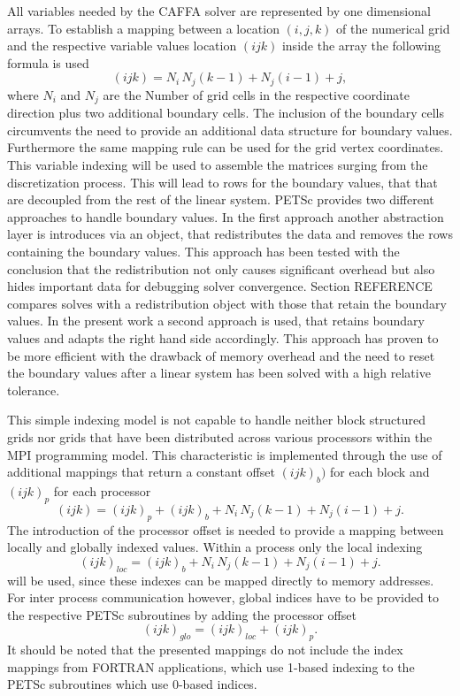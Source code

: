 All variables needed by the CAFFA solver are represented by one dimensional arrays. To establish a mapping between a location \((i,j,k)\) of the numerical grid and the respective variable values location \((ijk)\) inside the array the following formula is used
\begin{displaymath}
  (ijk) = N_i \, N_j \left(k - 1\right) + N_j \left(i - 1\right) + j,
\end{displaymath}
where \(N_i\) and \(N_j\) are the Number of grid cells in the respective coordinate direction plus two additional boundary cells. The inclusion of the boundary cells circumvents the need to provide an additional data structure for boundary values. Furthermore the same mapping rule can be used for the grid vertex coordinates. This variable indexing will be used to assemble the matrices surging from the discretization process. This will lead to rows for the boundary values, that that are decoupled from the rest of the linear system. PETSc provides two different approaches to handle boundary values. In the first approach another abstraction layer is introduces via an object, that redistributes the data and removes the rows containing the boundary values. This approach has been tested with the conclusion that the redistribution not only causes significant overhead but also hides important data for debugging solver convergence. Section REFERENCE compares solves with a redistribution object with those that retain the boundary values. In the present work a second approach is used, that retains boundary values and adapts the right hand side accordingly. This approach has proven to be more efficient with the drawback of memory overhead and the need to reset the boundary values after a linear system has been solved with a high relative tolerance.

This simple indexing model is not capable to handle neither block structured grids nor grids that have been distributed across various processors within the MPI programming model. This characteristic is implemented through the use of additional mappings that return a constant offset \((ijk)_b)\) for each block and \((ijk)_p\) for each processor
\begin{displaymath}
  (ijk) = (ijk)_p + (ijk)_b +  N_i \, N_j \left(k - 1\right) + N_j \left(i - 1\right) + j.
\end{displaymath}
The introduction of the processor offset is needed to provide a mapping between locally and globally indexed values. Within a process only the local indexing 
\begin{displaymath}
  (ijk)_{loc} = (ijk)_b +  N_i \, N_j \left(k - 1\right) + N_j \left(i - 1\right) + j.
\end{displaymath}
will be used, since these indexes can be mapped directly to memory addresses. For inter process communication however, global indices have to be provided to the respective PETSc subroutines by adding the processor offset
\begin{equation}
  \label{eq:globalmap}
  (ijk)_{glo} = (ijk)_{loc} + (ijk)_p.
\end{equation}
It should be noted that the presented mappings do not include the index mappings from FORTRAN applications, which use 1-based indexing to the PETSc subroutines which use 0-based indices.

